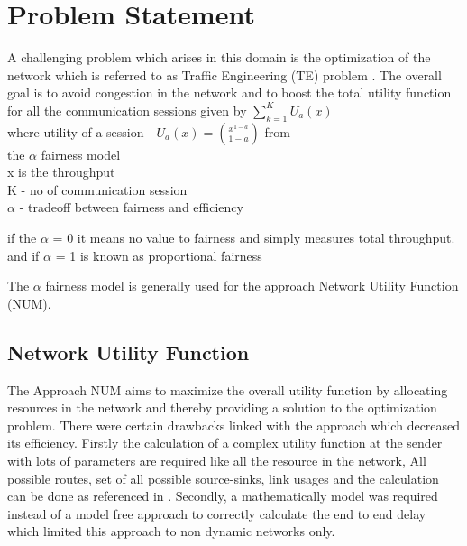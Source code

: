 \section{Problem Statement}
\label{sec:problem}

A challenging problem which arises in this domain is the optimization of the network which is referred to as Traffic Engineering (TE) problem \cite{Exp:_DRLapproach}. 
The overall goal is to avoid congestion in the network and to boost the total utility function \cite{Exp:_DRLapproach} for all the communication sessions given by 
$\sum_{k=1}^{K} U_{a}(x)$  \\
where utility of a session - $U_{a}(x)=\left(\frac{x^{1-a}}{1-a}\right)$  from \\ the $\alpha$ fairness model \cite{Exp:_DRLapproach} \\
x is the throughput \\ 
K - no of communication session \\
$\alpha$ - tradeoff between fairness and efficiency

if the $\alpha$ = 0 it means no value to fairness
and simply measures total throughput. 
and if $\alpha$ = 1 is known as proportional fairness

The $\alpha$ fairness model is generally used for the approach Network Utility Function (NUM).

\subsection{Network Utility Function}
\label{sec:NUM}

The Approach NUM \cite{low_Lapsley:_handb_Flowcontrol}  aims to maximize the overall utility function by allocating resources in the network and thereby providing a solution to the optimization problem. There were certain drawbacks linked with the approach which decreased its efficiency. Firstly the calculation of a complex utility function at the sender with lots of parameters are required like all the resource in the network, All possible routes, set of all possible source-sinks, link usages and the calculation can be done as referenced in \cite{low_Lapsley:_handb_Flowcontrol}. Secondly, a mathematically model was required instead of a model free approach to correctly calculate the end to end delay which limited this approach to non dynamic networks only. 

